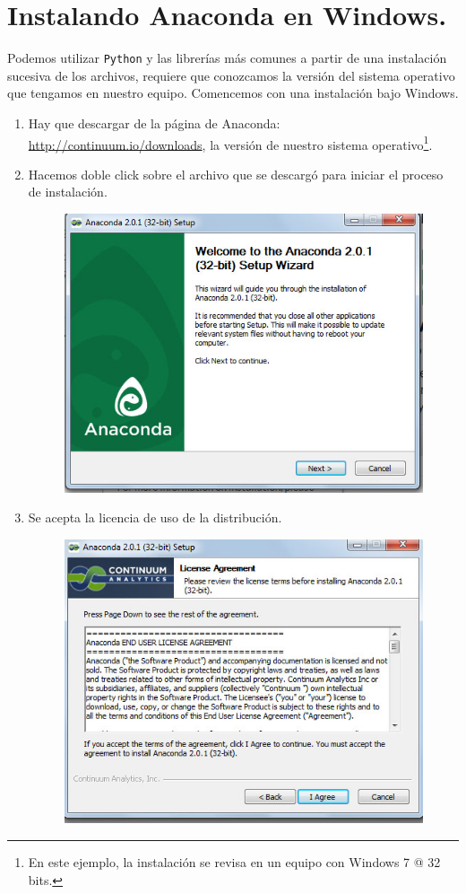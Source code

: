 \documentclass[12pt]{article}
\begin{document}
\section{Instalando Anaconda en Windows.}
Podemos utilizar \texttt{Python} y las librerías más comunes a partir de una instalación sucesiva de los archivos, requiere que conozcamos la versión del sistema operativo que tengamos en nuestro equipo. Comencemos con una instalación bajo Windows.
\begin{enumerate}
\item Hay que descargar de la página de Anaconda: \url{http://continuum.io/downloads}, la versión de nuestro sistema operativo\footnote{En este ejemplo, la instalación se revisa en un equipo con Windows 7 @ 32 bits.}.
\item Hacemos doble click sobre el archivo que se descargó para iniciar el proceso de instalación.
\begin{figure}[H]
	\centering
	\includegraphics[scale=0.5]{Imagenes/Instalacion_Anaconda_01.jpg} 
\end{figure}
\item Se acepta la licencia de uso de la distribución.
\begin{figure}[H]
	\centering
	\includegraphics[scale=0.5]{Imagenes/Instalacion_Anaconda_02.jpg} 

\end{figure}
\end{enumerate}
\end{document}
